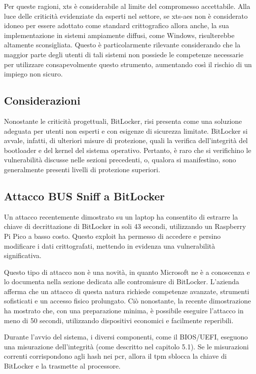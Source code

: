 Per queste ragioni, \acrshort{xts} è considerabile al limite del compromesso accettabile. Alla luce delle criticità evidenziate da esperti nel settore, se \acrshort{xts}-\acrshort{aes} non è considerato idoneo per essere adottato come standard crittografico allora anche, la sua implementazione in sistemi ampiamente diffusi, come Windows, risulterebbe altamente sconsigliata. Questo è particolarmente rilevante considerando che la maggior parte degli utenti di tali sistemi non possiede le competenze necessarie per utilizzare consapevolmente questo strumento, aumentando così il rischio di un impiego non sicuro.

\subsection{Considerazioni}\label{subsec:considerazioni}

Nonostante le criticità progettuali, BitLocker, risi presenta come una soluzione adeguata per utenti non esperti e con esigenze di sicurezza limitate. BitLocker si avvale, infatti, di ulteriori misure di protezione, quali la verifica dell'integrità del bootloader e del kernel del sistema operativo. Pertanto, è raro che si verifichino le vulnerabilità discusse nelle sezioni precedenti, o, qualora si manifestino, sono generalmente presenti livelli di protezione superiori.

\subsection{Attacco BUS Sniff a BitLocker}\label{subsec:attacco_bus_sniff}

Un attacco recentemente dimostrato su un laptop ha consentito di estrarre la chiave di decrittazione di BitLocker in soli 43 secondi, utilizzando un Raspberry Pi Pico a basso costo. Questo exploit ha permesso di accedere e persino modificare i dati crittografati, mettendo in evidenza una vulnerabilità significativa.

Questo tipo di attacco non è una novità, in quanto Microsoft ne è a conoscenza e lo documenta nella sezione dedicata alle contromisure di BitLocker. L'azienda afferma che un attacco di questa natura richiede competenze avanzate, strumenti sofisticati e un accesso fisico prolungato. Ciò nonostante, la recente dimostrazione ha mostrato che, con una preparazione minima, è possibile eseguire l'attacco in meno di 50 secondi, utilizzando dispositivi economici e facilmente reperibili.

Durante l’avvio del sistema, i diversi componenti, come il BIOS/UEFI, eseguono una misurazione dell’integrità (come descritto nel capitolo 5.1). Se le misurazioni correnti corrispondono agli hash nei \acrshort{pcr}, allora il \acrshort{tpm} sblocca la chiave di BitLocker e la trasmette al processore.

